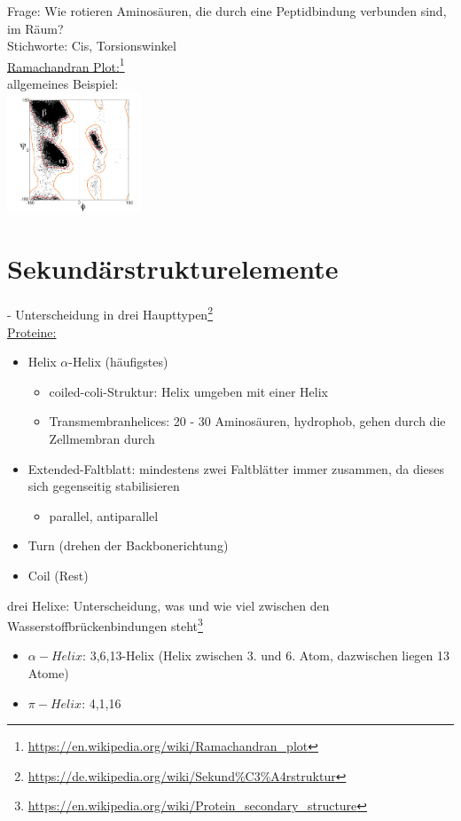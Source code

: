 Frage: Wie rotieren Aminosäuren, die durch eine Peptidbindung verbunden sind, im Räum?\\
Stichworte: Cis, Torsionswinkel\\

\underline{Ramachandran Plot:}\footnote{\url{https://en.wikipedia.org/wiki/Ramachandran_plot}}\\
allgemeines Beispiel:\\
\includegraphics[width=0.3\textwidth]{lectures/160530/pix/Ramachandran_plot_general_100K.jpg}

\section{Sekundärstrukturelemente}
 - Unterscheidung in drei Haupttypen\footnote{\url{https://de.wikipedia.org/wiki/Sekund\%C3\%A4rstruktur}}\\
\underline{Proteine:}
\begin{itemize}
	\item Helix $\alpha$-Helix (häufigstes)
	\begin{itemize}
		\item coiled-coli-Struktur: Helix umgeben mit einer Helix
		\item Transmembranhelices: 20 - 30 Aminosäuren, hydrophob, gehen durch die Zellmembran durch
	\end{itemize}
	\item Extended-Faltblatt: mindestens zwei Faltblätter immer zusammen, da dieses sich gegenseitig stabilisieren
	\begin{itemize}
		\item parallel, antiparallel
	\end{itemize}
	\item Turn (drehen der Backbonerichtung)
	\item Coil (Rest)
\end{itemize}

drei Helixe: Unterscheidung, was und wie viel zwischen den Wasserstoffbrückenbindungen steht\footnote{\url{https://en.wikipedia.org/wiki/Protein_secondary_structure}}
\begin{itemize}
	\item $\alpha-Helix$: 3,6,13-Helix (Helix zwischen 3. und 6. Atom, dazwischen liegen 13 Atome)
	\item $\pi-Helix$: 4,1,16
\end{itemize}

